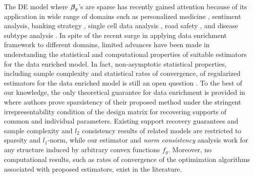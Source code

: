 The DE model where $\boldsymbol{\beta}_g$'s are sparse has recently gained attention because of its application in wide range of domains such as personalized medicine \cite{domu16}, sentiment analysis, banking strategy \cite{grti16}, single cell data analysis \cite{olvi15}, road safety \cite{olvi14}, and disease subtype analysis \cite{domu16}.
In spite of the recent surge in applying data enrichment framework to different domains, limited advances have been made in
understanding the statistical and computational properties of suitable estimators for the data enriched model.
In fact, non-asymptotic statistical properties, including sample complexity and statistical rates of convergence, of regularized estimators for the data enriched model is still an open question \cite{grti16, olvi14}.
To the best of our knowledge, the only theoretical guarantee for data enrichment is provided in \cite{olvi15} where authors prove sparsistency of their proposed method under the stringent irrepresentability condition of the design matrix for recovering supports of common and individual parameters.
Existing support recovery guarantees \cite{olvi15} and sample complexity and $l_2$ consistency results \cite{jrsr10} of related models are restricted to sparsity and $l_1$-norm, while our estimator and \emph{norm consistency} analysis work for any structure induced by arbitrary convex functions $f_g$. 
Moreover, no computational results, such as rates of convergence of the optimization algorithms associated with proposed estimators, exist in the literature.

